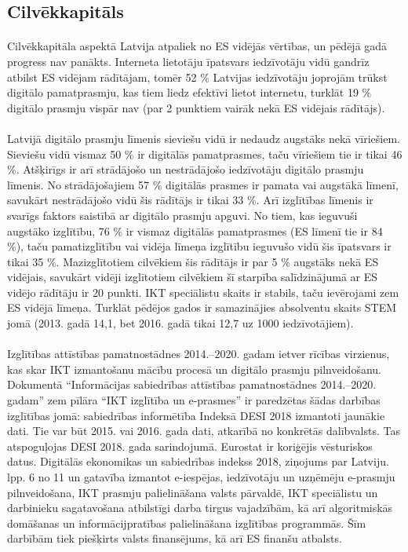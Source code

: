 \subsection{Cilvēkkapitāls}
\paragraph{}
Cilvēkkapitāla aspektā Latvija atpaliek no ES vidējās vērtības, un pēdējā gadā progress nav
panākts. Interneta lietotāju īpatsvars iedzīvotāju vidū gandrīz atbilst ES vidējam rādītājam,
tomēr 52 \% Latvijas iedzīvotāju joprojām trūkst digitālo pamatprasmju, kas tiem liedz efektīvi
lietot internetu, turklāt 19 \% digitālo prasmju vispār nav (par 2 punktiem vairāk nekā ES
vidējais rādītājs).
\paragraph{}
Latvijā digitālo prasmju līmenis sieviešu vidū ir nedaudz augstāks nekā vīriešiem. Sieviešu
vidū vismaz 50 \% ir digitālās pamatprasmes, taču vīriešiem tie ir tikai 46 \%. Atšķirīgs ir arī
strādājošo un nestrādājošo iedzīvotāju digitālo prasmju līmenis. No strādājošajiem 57 \%
digitālās prasmes ir pamata vai augstākā līmenī, savukārt nestrādājošo vidū šis rādītājs ir
tikai 33 \%. Arī izglītības līmenis ir svarīgs faktors saistībā ar digitālo prasmju apguvi. No tiem,
kas ieguvuši augstāko izglītību, 76 \% ir vismaz digitālās pamatprasmes (ES līmenī tie ir
84 \%), taču pamatizglītību vai vidēja līmeņa izglītību ieguvušo vidū šis īpatsvars ir tikai 35 \%.
Mazizglītotiem cilvēkiem šis rādītājs ir par 5 \% augstāks nekā ES vidējais, savukārt vidēji
izglītotiem cilvēkiem šī starpība salīdzinājumā ar ES vidējo rādītāju ir 20 punkti. IKT
speciālistu skaits ir stabils, taču ievērojami zem ES vidējā līmeņa. Turklāt pēdējos gados ir
samazinājies absolventu skaits STEM jomā (2013. gadā 14,1, bet 2016. gadā tikai 12,7 uz
1000 iedzīvotājiem).
\paragraph{}
Izglītības attīstības pamatnostādnes 2014.–2020. gadam ietver rīcības virzienus, kas skar
IKT izmantošanu mācību procesā un digitālo prasmju pilnveidošanu. Dokumentā
“Informācijas sabiedrības attīstības pamatnostādnes 2014.–2020. gadam” zem pīlāra “IKT
izglītība un e-prasmes” ir paredzētas šādas darbības izglītības jomā: sabiedrības informētība
Indeksā DESI 2018 izmantoti jaunākie dati. Tie var būt 2015. vai 2016. gada dati, atkarībā no konkrētās
dalībvalsts. Tas atspoguļojas DESI 2018. gada sarindojumā. Eurostat ir koriģējis vēsturiskos datus.
Digitālās ekonomikas un sabiedrības indekss 2018, ziņojums par Latviju. lpp. 6 no 11
un gatavība izmantot e-iespējas, iedzīvotāju un uzņēmēju e-prasmju pilnveidošana, IKT
prasmju palielināšana valsts pārvaldē, IKT speciālistu un darbinieku sagatavošana atbilstīgi
darba tirgus vajadzībām, kā arī algoritmiskās domāšanas un informācijpratības palielināšana
izglītības programmās. Šīm darbībām tiek piešķirts valsts finansējums, kā arī ES finanšu
atbalsts.

